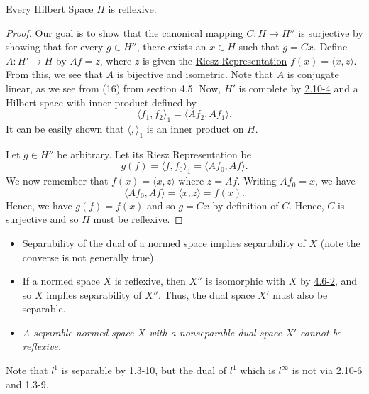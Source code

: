 \begin{theorem}
   Every Hilbert Space \( H  \) is reflexive. 
\end{theorem}

\begin{proof}
Our goal is to show that the canonical mapping \( C : H \to H'' \) is surjective by showing that for every \( g \in H'' \), there exists an \( x \in H  \) such that \( g = C x  \). Define \( A : H' \to H  \) by \( Af = z  \), where \( z  \) is given the {\hyperref[Riesz Representation]{Riesz Representation}} \( f(x) = \langle x , z  \rangle  \). From this, we see that \( A  \) is bijective and isometric. Note that \( A  \) is conjugate linear, as we see from (16) from section 4.5. Now, \( H' \) is complete by {\hyperref[2.10-4]{2.10-4}} and a Hilbert space with inner product defined by
\[  \langle {f}_{1}  ,  {f}_{2} \rangle_1 = \langle A {f}_{2} ,  A {f}_{1} \rangle. \]
It can be easily shown that \( \langle  ,  \rangle_1  \) is an inner product on \( H  \).

Let \( g \in H'' \) be arbitrary. Let its Riesz Representation be 
\[  g(f) = \langle f , {f}_{0} \rangle_1 = \langle A {f}_{0} ,  A f \rangle. \]
We now remember that \( f(x) = \langle x  , z  \rangle  \) where \( z = A f  \). Writing \( A {f}_{0} = x  \), we have 
\[  \langle A {f}_{0}  ,  A f  \rangle = \langle x  , z  \rangle = f(x). \]
Hence, we have \( g(f) = f(x) \) and so \( g = C x  \) by definition of \( C  \). Hence, \( C  \) is surjective and so \( H  \) must be reflexive.
\end{proof}

\begin{itemize}
    \item Separability of the dual of a normed space implies separability of \( X  \) (note the converse is not generally true).
    \item  If a normed space \( X  \) is reflexive, then \( X'' \) is isomorphic with \( X  \) by {\hyperref[4.6-2]{4.6-2}}, and so \( X  \) implies separability of \( X'' \). Thus, the dual space \( X' \) must also be separable.
    \item \textit{A separable normed space \( X  \) with a nonseparable dual space \( X' \) cannot be reflexive.} 
\end{itemize}

\begin{eg}
    Note that \( l^1  \) is separable by 1.3-10, but the dual of \( l^1  \) which is \( l^{\infty } \) is not via 2.10-6 and 1.3-9.
\end{eg}

